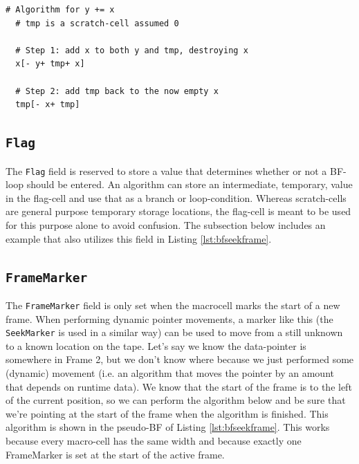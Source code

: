 \begin{lstfloat}[H]
\begin{lstlisting}[style=brainfuck]
  # Algorithm for y += x
  # tmp is a scratch-cell assumed 0

  # Step 1: add x to both y and tmp, destroying x
  x[- y+ tmp+ x]

  # Step 2: add tmp back to the now empty x
  tmp[- x+ tmp]
\end{lstlisting}
\caption{Non-destructive addition of one cell to another, using a temporary scratch cell.}
\label{lst:bfadd}
\end{lstfloat}

\subsection{\texttt{Flag}}
\label{sec:compilation:flag}
The \texttt{Flag} field is reserved to store a value that determines whether or not a BF-loop should be entered. An algorithm can store an intermediate, temporary, value in the flag-cell and use that as a branch or loop-condition. Whereas scratch-cells are general purpose temporary storage locations, the flag-cell is meant to be used for this purpose alone to avoid confusion. The subsection below includes an example that also utilizes this field in Listing \ref{lst:bfseekframe}.

\subsection{\texttt{FrameMarker}}
\label{sec:compilation:framemarker}
The \texttt{FrameMarker} field is only set when the macrocell marks the start of a new frame. When performing dynamic pointer movements, a marker like this (the \texttt{SeekMarker} is used in a similar way) can be used to move from a still unknown to a known location on the tape. Let's say we know the data-pointer is somewhere in Frame 2, but we don't know where because we just performed some (dynamic) movement (i.e. an algorithm that moves the pointer by an amount that depends on runtime data). We know that the start of the frame is to the left of the current position, so we can perform the algorithm below and be sure that we're pointing at the start of the frame when the algorithm is finished. This algorithm is shown in the pseudo-BF of Listing \ref{lst:bfseekframe}. This works because every macro-cell has the same width and because exactly one FrameMarker is set at the start of the active frame.

